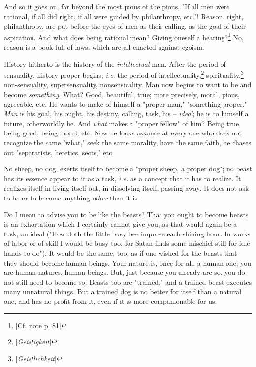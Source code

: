 \documentclass[a4paper]{book}
\begin{document}
And so it goes on, far beyond the most pious of the pious. "{}If all men were 
rational, if all did right, if all were guided by philanthropy, etc."{}! 
Reason, right, philanthropy, are put before the eyes of men as their calling, 
as the goal of their aspiration. And what does being rational mean? Giving 
oneself a hearing?\footnote{[Cf. note p. 81]} No, reason is a book full of 
laws, which are all enacted against egoism.

History hitherto is the history of the \textit{intellectual} man. After the 
period of sensuality, history proper begins; \textit{i.e.} the period of 
intellectuality,\footnote{[\textit{Geistigkeit}]} 
spirituality,\footnote{[\textit{Geistlichkeit}]} non-sensuality, 
supersensuality, nonsensicality. Man now begins to want to be and become 
\textit{something}. What? Good, beautiful, true; more precisely, moral, pious, 
agreeable, etc. He wants to make of himself a "{}proper man,"{} "{}something 
proper."{} \textit{Man} is his goal, his ought, his destiny, calling, task, 
his -- \textit{ideal}; he is to himself a future, otherworldly he. And 
\textit{what} makes a "{}proper fellow"{} of him? Being true, being good, 
being moral, etc. Now he looks askance at every one who does not recognize the 
same "{}what,"{} seek the same morality, have the same faith, he chases out 
"{}separatists, heretics, sects,"{} etc.

No sheep, no dog, exerts itself to become a "{}proper sheep, a proper dog"{}; 
no beast has its essence appear to it as a task, \textit{i.e.} as a concept 
that it has to realize. It realizes itself in living itself out, in dissolving 
itself, passing away. It does not ask to be or to become anything 
\textit{other} than it is.

Do I mean to advise you to be like the beasts? That you ought to become beasts 
is an exhortation which I certainly cannot give you, as that would again be a 
task, an ideal ("{}How doth the little busy bee improve each shining hour. In 
works of labor or of skill I would be busy too, for Satan finds some mischief 
still for idle hands to do"{}). It would be the same, too, as if one wished 
for the beasts that they should become human beings. Your nature is, once for 
all, a human one; you are human natures, human beings. But, just because you 
already are so, you do not still need to become so. Beasts too are 
"{}trained,"{} and a trained beast executes many unnatural things. But a 
trained dog is no better for itself than a natural one, and has no profit from 
it, even if it is more companionable for us.
\end{document}
